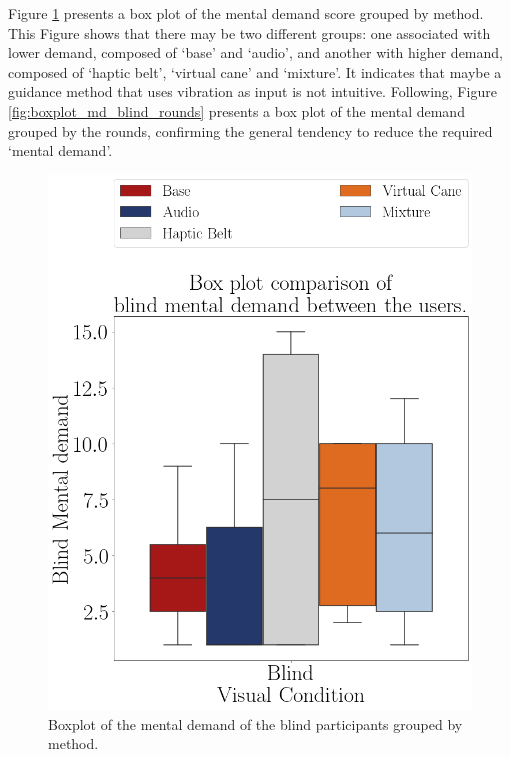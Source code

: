 Figure \ref{fig:boxplot_md_blind_scene}  presents a box plot of the mental demand score grouped by method. This Figure shows that there may be two different groups: one associated with lower demand, composed of ‘base’ and ‘audio’, and another with higher demand, composed of ‘haptic belt’, ‘virtual cane’ and ‘mixture’. It indicates that maybe a guidance method that uses vibration as input is not intuitive. Following, Figure \ref{fig:boxplot_md_blind_rounds} presents a box plot of the mental demand grouped by the rounds, confirming the general tendency to reduce the required ‘mental demand’. 

\begin{figure}[!htb]
    \centering
    \begin{minipage}{0.45\textwidth}
        \centering
        \includegraphics[width = 0.8\linewidth]{Resultados/Nasa/Figuras/png/boxplot_md_blind_scene.png}
        \caption{Boxplot of the mental demand of the blind participants grouped by method.}
        \label{fig:boxplot_md_blind_scene}
    \end{minipage}
    \begin{minipage}{0.45\textwidth}
        \centering

\end{minipage}
\end{figure}

